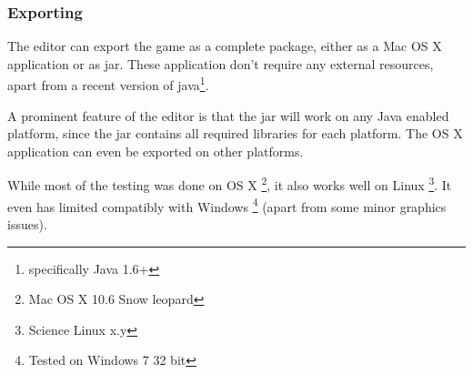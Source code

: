 \clearpage
\subsubsection{Exporting}
\label{ssub:exporting}

The editor can export the game as a complete package, either as a Mac OS X application or as jar. These application don't require any external resources, apart from a recent version of java\footnote{specifically Java 1.6+}.

A prominent feature of the editor is that the jar will work on any Java enabled platform, since the jar contains all required libraries for each platform. The OS X application can even be exported on other platforms.

While most of the testing was done on OS X \footnote{Mac OS X 10.6 Snow leopard}, it also works well on Linux \footnote{Science  Linux x.y}. It even has limited compatibly with Windows \footnote{Tested on Windows 7 32 bit} (apart from some minor graphics issues).
